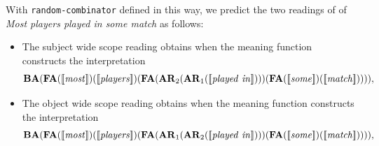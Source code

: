 \documentclass[pdfextras]{handbook}
\newcommand{\llbracket}{\ensuremath{\left [\!\left [}}%
\newcommand{\rrbracket}{\ensuremath{\right ]\!\right ]}}
\providecommand{\sv}[1]{\ensuremath{\llbracket \mathit{#1} \rrbracket}}
\begin{document}
With \lstinline{random-combinator} defined in this way, we predict the two readings of of \emph{Most players played in some match} as follows:
\begin{itemize}
\item The subject wide scope reading obtains when the meaning function constructs the interpretation
$$
\mathbf{BA}(\mathbf{FA}(\sv{most})(\sv{players})
(\mathbf{FA}(\mathbf{AR}_2(\mathbf{AR}_1(\sv{played\ in})))
(\mathbf{FA}(\sv{some})(\sv{match})))),
$$  
\item The object wide scope reading obtains when the meaning function constructs the interpretation
$$
\mathbf{BA}(\mathbf{FA}(\sv{most})(\sv{players})
(\mathbf{FA}(\mathbf{AR}_1(\mathbf{AR}_2(\sv{played\ in})))
(\mathbf{FA}(\sv{some})(\sv{match})))),
$$  
\end{itemize}
\end{document}
